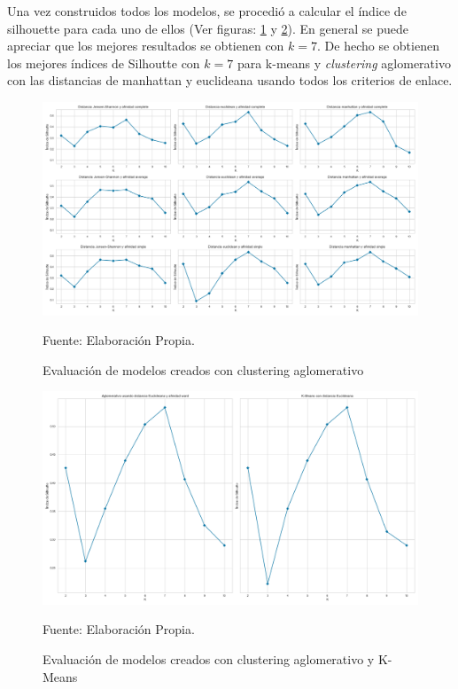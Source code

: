     Una vez construidos todos los modelos, se procedió a calcular el índice de silhouette para cada uno de ellos (Ver figuras: \ref{fig:aglomerative_silhoutte} y \ref{fig:k-means_silhoutte}). En general se puede apreciar que los mejores resultados se obtienen con $k=7$. De hecho se obtienen los mejores índices de Silhoutte con $k=7$ para k-means y \textit{clustering} aglomerativo con las distancias de manhattan y euclideana usando todos los criterios de enlace.

     \begin{figure}[H]
        \centering
        \includegraphics[width=1\textwidth]{figures/Clustering/aglomerative_clustering.png}
        \caption{\label{fig:aglomerative_silhoutte} Evaluación de modelos creados con clustering aglomerativo} Fuente: Elaboración Propia.
    \end{figure}
    
    \begin{figure}[H]
        \centering
        \includegraphics[width=1\textwidth]{figures/Clustering/k-means.png}
        \caption{\label{fig:k-means_silhoutte} Evaluación de modelos creados con clustering aglomerativo y K-Means} Fuente: Elaboración Propia.
    \end{figure}
    

